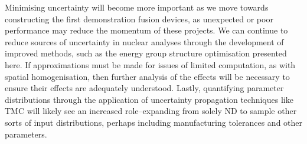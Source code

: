 Minimising uncertainty will become more important as we move towards constructing the first demonstration fusion devices, as unexpected or poor performance may reduce the momentum of these projects. We can continue to reduce sources of uncertainty in nuclear analyses through the development of improved methods, such as the energy group structure optimisation presented here. If approximations must be made for issues of limited computation, as with spatial homogenisation, then further analysis of the effects will be necessary to ensure their effects are adequately understood. Lastly, quantifying parameter distributions through the application of uncertainty propagation techniques like TMC will likely see an increased role--expanding from solely ND to sample other sorts of input distributions, perhaps including manufacturing tolerances and other parameters.








